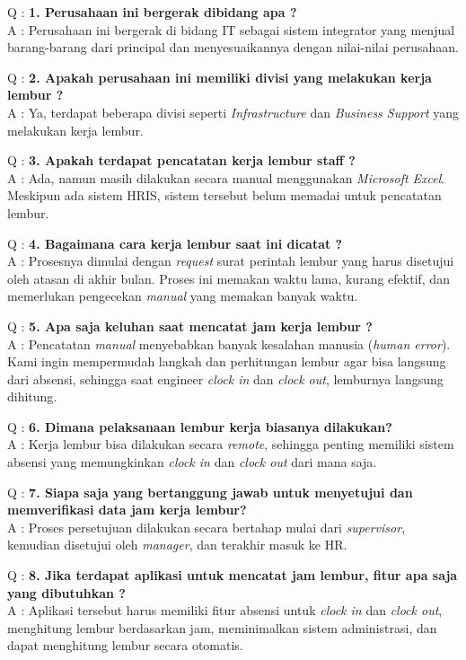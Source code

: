 \noindent Q : \textbf{1. Perusahaan ini bergerak dibidang apa ?}
\\ A : Perusahaan ini bergerak di bidang IT sebagai sistem integrator yang menjual barang-barang dari principal dan menyesuaikannya dengan nilai-nilai perusahaan.

\noindent Q : \textbf{2. Apakah perusahaan ini memiliki divisi yang melakukan kerja lembur ?}
\\ A : Ya, terdapat beberapa divisi seperti \textit{Infrastructure} dan \textit{Business Support} yang melakukan kerja lembur.

\noindent Q : \textbf{3. Apakah terdapat pencatatan kerja lembur staff ?}
\\ A : Ada, namun masih dilakukan secara manual menggunakan \textit{Microsoft Excel}. Meskipun ada sistem HRIS, sistem tersebut belum memadai untuk pencatatan lembur.

\noindent Q : \textbf{4. Bagaimana cara kerja lembur saat ini dicatat ?}
\\ A : Prosesnya dimulai dengan \textit{request} surat perintah lembur yang harus disetujui oleh atasan di akhir bulan. Proses ini memakan waktu lama, kurang efektif, dan memerlukan pengecekan \textit{manual} yang memakan banyak waktu.

\noindent Q : \textbf{5. Apa saja keluhan saat mencatat jam kerja lembur ?}
\\ A : Pencatatan \textit{manual} menyebabkan banyak kesalahan manusia (\textit{human error}). Kami ingin mempermudah langkah dan perhitungan lembur agar bisa langsung dari absensi, sehingga saat engineer \textit{clock in} dan \textit{clock out}, lemburnya langsung dihitung.

\noindent Q : \textbf{6. Dimana pelaksanaan lembur kerja biasanya dilakukan?}
\\ A : Kerja lembur bisa dilakukan secara \textit{remote}, sehingga penting memiliki sistem absensi yang memungkinkan \textit{clock in} dan \textit{clock out} dari mana saja.

\noindent Q : \textbf{7. Siapa saja yang bertanggung jawab untuk menyetujui dan memverifikasi data jam kerja lembur?}
\\ A : Proses persetujuan dilakukan secara bertahap mulai dari \textit{supervisor}, kemudian disetujui oleh \textit{manager}, dan terakhir masuk ke HR.

\noindent Q : \textbf{8. Jika terdapat aplikasi untuk mencatat jam lembur, fitur apa saja yang dibutuhkan ?}
\\ A : Aplikasi tersebut harus memiliki fitur absensi untuk \textit{clock in} dan \textit{clock out}, menghitung lembur berdasarkan jam, meminimalkan sistem administrasi, dan dapat menghitung lembur secara otomatis.

